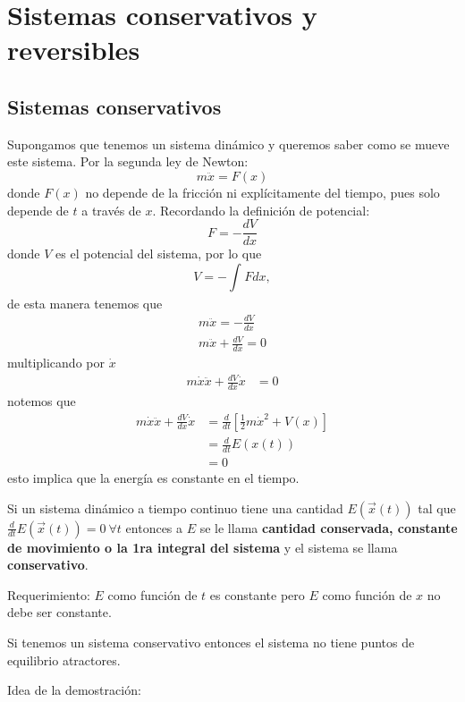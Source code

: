 \section{Sistemas conservativos y reversibles}
\subsection{Sistemas conservativos}

	Supongamos que tenemos un sistema dinámico y queremos saber como se mueve este sistema. Por la segunda ley de Newton:
	\begin{equation*}
	  m \ddot{x} = F(x) 
	\end{equation*}
donde $F(x)$ no depende de la fricción ni explícitamente del tiempo, pues solo depende de $t$ a través de  $x$.
Recordando la definición de potencial:
 \begin{equation*}
  F= -\frac{dV}{dx} 
\end{equation*}
donde $V$ es el potencial del sistema, por lo que
 \begin{equation*}
  V = - \int_{}^{} F d{x},   
\end{equation*}
de esta manera tenemos que 
\begin{gather*}
  m \ddot{x} = -\frac{dV}{dx} \\
  m \ddot{x} + \frac{dV}{dx} = 0
\end{gather*}
multiplicando por $\dot{x}$
\begin{align*}
  m \dot{x} \ddot{x} + \frac{dV}{dx} \dot{x}&=0 
\end{align*}
notemos que 
\begin{align*}
	m \dot{x} \ddot{x} + \frac{dV}{dx} \dot{x}  &= \frac{d}{dt} \left[ \frac{1}{2}m \dot{x}^2 + V(x) \right] \\
	&= \frac{d}{dt} E(x(t)) \\
	&= 0   
\end{align*}
esto implica que la energía es constante en el tiempo.
\begin{tcolorbox}[colback=Black!4, colframe=White,arc=2mm]
\begin{definicion}
	Si un sistema dinámico a tiempo continuo tiene una cantidad $E(\vec{x}(t))$ tal que $\frac{d}{dt}E(\vec{x}(t))=0 \ \forall t$ entonces a  $E$ se le llama  \textbf{cantidad conservada, constante de movimiento o la 1ra integral del sistema} y el sistema se llama \textbf{conservativo}.

	Requerimiento: $E$ como función de $t$ es constante pero  $E$ como función de  $x$ no debe ser constante. 
\end{definicion}
\end{tcolorbox}
\begin{tcolorbox}[colback=Black!4, colframe=White,arc=2mm]
\begin{teorema}
Si tenemos un sistema conservativo entonces el sistema no tiene puntos de equilibrio atractores. 
\end{teorema}
\end{tcolorbox}
Idea de la demostración:

